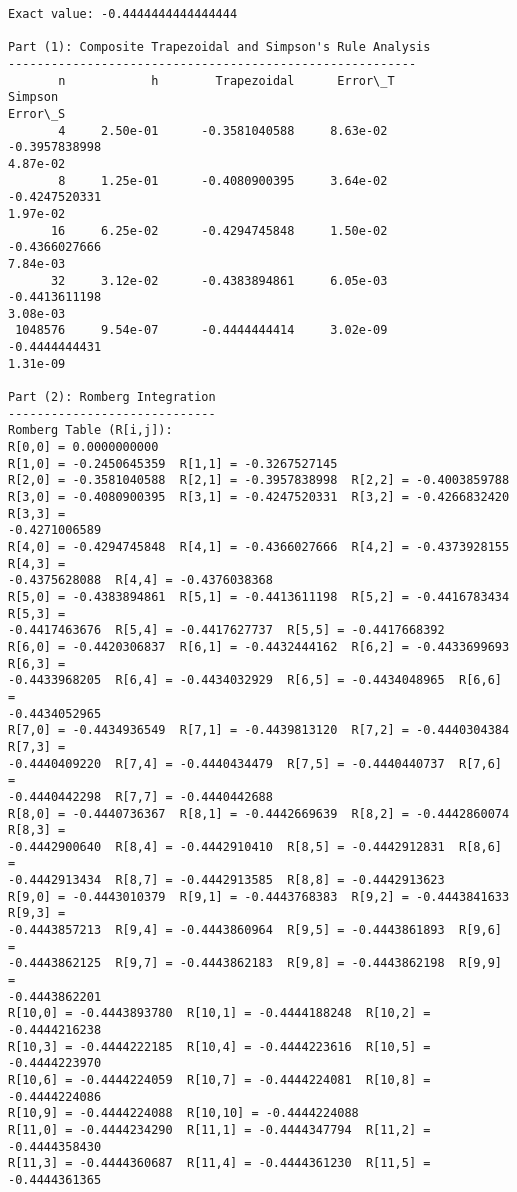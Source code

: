 \documentclass[11pt]{article}
\begin{document}
    \begin{Verbatim}[commandchars=\\\{\}]
Exact value: -0.4444444444444444

Part (1): Composite Trapezoidal and Simpson's Rule Analysis
---------------------------------------------------------
       n            h        Trapezoidal      Error\_T            Simpson
Error\_S
       4     2.50e-01      -0.3581040588     8.63e-02      -0.3957838998
4.87e-02
       8     1.25e-01      -0.4080900395     3.64e-02      -0.4247520331
1.97e-02
      16     6.25e-02      -0.4294745848     1.50e-02      -0.4366027666
7.84e-03
      32     3.12e-02      -0.4383894861     6.05e-03      -0.4413611198
3.08e-03
 1048576     9.54e-07      -0.4444444414     3.02e-09      -0.4444444431
1.31e-09

Part (2): Romberg Integration
-----------------------------
Romberg Table (R[i,j]):
R[0,0] = 0.0000000000
R[1,0] = -0.2450645359  R[1,1] = -0.3267527145
R[2,0] = -0.3581040588  R[2,1] = -0.3957838998  R[2,2] = -0.4003859788
R[3,0] = -0.4080900395  R[3,1] = -0.4247520331  R[3,2] = -0.4266832420  R[3,3] =
-0.4271006589
R[4,0] = -0.4294745848  R[4,1] = -0.4366027666  R[4,2] = -0.4373928155  R[4,3] =
-0.4375628088  R[4,4] = -0.4376038368
R[5,0] = -0.4383894861  R[5,1] = -0.4413611198  R[5,2] = -0.4416783434  R[5,3] =
-0.4417463676  R[5,4] = -0.4417627737  R[5,5] = -0.4417668392
R[6,0] = -0.4420306837  R[6,1] = -0.4432444162  R[6,2] = -0.4433699693  R[6,3] =
-0.4433968205  R[6,4] = -0.4434032929  R[6,5] = -0.4434048965  R[6,6] =
-0.4434052965
R[7,0] = -0.4434936549  R[7,1] = -0.4439813120  R[7,2] = -0.4440304384  R[7,3] =
-0.4440409220  R[7,4] = -0.4440434479  R[7,5] = -0.4440440737  R[7,6] =
-0.4440442298  R[7,7] = -0.4440442688
R[8,0] = -0.4440736367  R[8,1] = -0.4442669639  R[8,2] = -0.4442860074  R[8,3] =
-0.4442900640  R[8,4] = -0.4442910410  R[8,5] = -0.4442912831  R[8,6] =
-0.4442913434  R[8,7] = -0.4442913585  R[8,8] = -0.4442913623
R[9,0] = -0.4443010379  R[9,1] = -0.4443768383  R[9,2] = -0.4443841633  R[9,3] =
-0.4443857213  R[9,4] = -0.4443860964  R[9,5] = -0.4443861893  R[9,6] =
-0.4443862125  R[9,7] = -0.4443862183  R[9,8] = -0.4443862198  R[9,9] =
-0.4443862201
R[10,0] = -0.4443893780  R[10,1] = -0.4444188248  R[10,2] = -0.4444216238
R[10,3] = -0.4444222185  R[10,4] = -0.4444223616  R[10,5] = -0.4444223970
R[10,6] = -0.4444224059  R[10,7] = -0.4444224081  R[10,8] = -0.4444224086
R[10,9] = -0.4444224088  R[10,10] = -0.4444224088
R[11,0] = -0.4444234290  R[11,1] = -0.4444347794  R[11,2] = -0.4444358430
R[11,3] = -0.4444360687  R[11,4] = -0.4444361230  R[11,5] = -0.4444361365

\end{Verbatim}
\end{document}
